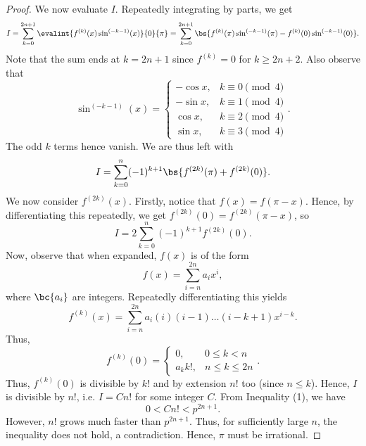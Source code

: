\begin{proof}
    We now evaluate $I$. Repeatedly integrating by parts, we get \[I = \sum_{k = 0}^{2n+1} \evalint{f^{(k)}(x) \sin^{(-k-1)} (x)}{0}{\pi} = \sum_{k = 0}^{2n+1} \bs{f^{(k)}(\pi) \sin^{(-k-1)}(\pi) - f^{(k)}(0) \sin^{(-k-1)}(0)}.\] Note that the sum ends at $k = 2n+1$ since $f^{(k)} = 0$ for $k \geq 2n+2$. Also observe that \[\sin^{(-k-1)}(x) = \begin{cases}
        -\cos x, & k \equiv 0 \pmod{4}\\
        -\sin x, & k \equiv 1 \pmod{4}\\
        \cos x, & k \equiv 2 \pmod{4}\\
        \sin x, & k \equiv 3 \pmod{4}
    \end{cases}.\]
    The odd $k$ terms hence vanish. We are thus left with \[I = \sum_{k = 0}^{n} (-1)^{k+1} \bs{f^{(2k)}(\pi) + f^{(2k)}(0)}.\] We now consider $f^{(2k)}(x)$. Firstly, notice that $f(x) = f(\pi - x)$. Hence, by differentiating this repeatedly, we get $f^{(2k)}(0) = f^{(2k)}(\pi - x)$, so \[I = 2 \sum_{k = 0}^{n} (-1)^{k+1} f^{(2k)}(0).\] Now, observe that when expanded, $f(x)$ is of the form \[f(x) = \sum_{i = n}^{2n} a_i x^{i},\] where $\bc{a_i}$ are integers. Repeatedly differentiating this yields \[f^{(k)}(x) = \sum_{i = n}^{2n} a_i (i)(i-1)\dots(i-k+1) x^{i - k}.\] Thus, \[f^{(k)}(0) = \begin{cases}
        0, & 0 \leq k < n\\
        a_k k!, & n \leq k \leq 2n
    \end{cases}.\]
    Thus, $f^{(k)}(0)$ is divisible by $k!$ and by extension $n!$ too (since $n \leq k$). Hence, $I$ is divisible by $n!$, i.e. $I = Cn!$ for some integer $C$. From Inequality (1), we have \[0 < C n! < p^{2n+1}.\] However, $n!$ grows much faster than $p^{2n+1}$. Thus, for sufficiently large $n$, the inequality does not hold, a contradiction. Hence, $\pi$ must be irrational.
\end{proof}

